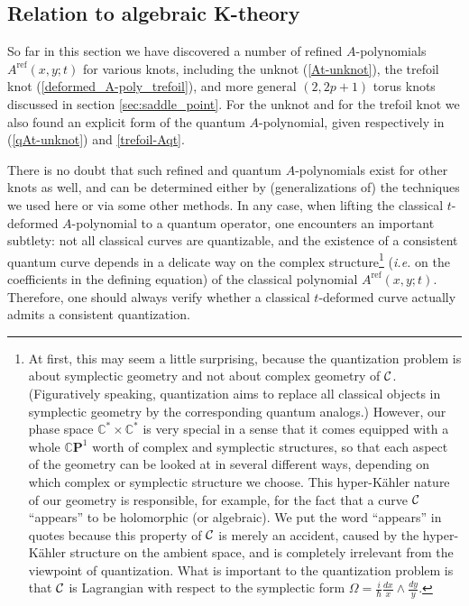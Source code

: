 \documentclass[hyper,letterpaper]{JHEP3}
\newcommand{\C}{{\mathbb C}}
\newcommand{\cC}{{\cal C }}
\newcommand{\cp}{{\mathbb{C}}{\mathbf{P}}}
\begin{document}

\subsection{Relation to algebraic K-theory}
\label{sec:quantizability}

So far in this section we have discovered a number of refined $A$-polynomials $A^{\textrm{ref}}(x,y;t)$ for various knots,
including the unknot (\ref{At-unknot}), the trefoil knot (\ref{deformed_A-poly_trefoil}),
and more general $(2,2p+1)$ torus knots discussed in section \ref{sec:saddle_point}.
For the unknot and for the trefoil knot we also found an explicit form of the quantum $A$-polynomial,
given respectively in (\ref{qAt-unknot}) and \eqref{trefoil-Aqt}.

There is no doubt that such refined and quantum $A$-polynomials exist for other knots as well,
and can be determined either by (generalizations of) the techniques we used here or via some other methods.
In any case, when lifting the classical $t$-deformed $A$-polynomial to a quantum operator,
one encounters an important subtlety: not all classical curves are quantizable,
and the existence of a consistent quantum curve depends in a delicate way on the complex
structure\footnote{At first, this may seem a little surprising, because the quantization problem
is about symplectic geometry and not about complex geometry of $\cC$.
(Figuratively speaking, quantization aims to replace all classical objects in symplectic geometry
by the corresponding quantum analogs.) However, our phase space $\C^* \times \C^*$
is very special in a sense that it comes equipped with a whole $\cp^1$ worth of complex and symplectic structures,
so that each aspect of the geometry can be looked at in several different ways, depending on which
complex or symplectic structure we choose. This hyper-K\"ahler nature of our geometry is responsible,
for example, for the fact that a curve $\cC$ ``appears'' to be holomorphic (or algebraic).
We put the word ``appears'' in quotes because this property of $\cC$ is merely an accident,
caused by the hyper-K\"ahler structure on the ambient space, and is completely irrelevant from the viewpoint of quantization.
What is important to the quantization problem is that $\cC$ is Lagrangian with respect
to the symplectic form $\Omega = \frac{i}{\hbar} \frac{dx}{x} \wedge \frac{dy}{y}$.}
({\it i.e.} on the coefficients in the defining equation) of the classical polynomial $A^{\textrm{ref}}(x,y;t)$.
Therefore, one should always verify whether a classical $t$-deformed curve actually admits a consistent quantization.
\end{document}
